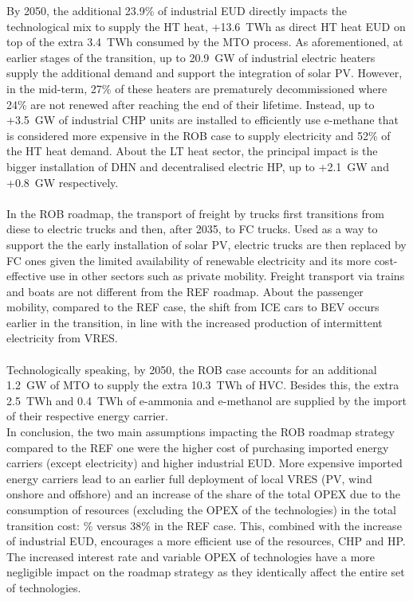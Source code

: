 By 2050, the additional 23.9\% of industrial \gls{EUD} directly impacts the technological mix to supply the \gls{HT} heat, \ie +13.6~TWh as direct \gls{HT} heat \gls{EUD} on top of the extra 3.4~TWh consumed by the \gls{MTO} process. As aforementioned, at earlier stages of the transition, up to 20.9~GW of industrial electric heaters supply the additional demand and support the integration of solar \gls{PV}.  However, in the mid-term, 27\% of these heaters are prematurely decommissioned where 24\% are not renewed after reaching the end of their lifetime. Instead, up to +3.5~GW of industrial \gls{CHP} units are installed to efficiently use e-methane that is considered more expensive in the ROB case to supply electricity and 52\% of the \gls{HT} heat demand. About the \gls{LT} heat sector, the principal impact is the bigger installation of \gls{DHN} and decentralised electric \gls{HP}, up to +2.1~GW and +0.8~GW respectively. \\

\\

In the ROB roadmap, the transport of freight by trucks first transitions from diese to electric trucks and then, after 2035, to \gls{FC} trucks. Used as a way to support the the early installation of solar \gls{PV}, electric trucks are then replaced by \gls{FC} ones given the limited availability of renewable electricity and its more cost-effective use in other sectors such as private mobility. Freight transport via trains and boats are not different from the REF roadmap. About the passenger mobility, compared to the REF case, the shift from \gls{ICE} cars to \gls{BEV} occurs earlier in the transition, in line with the increased production of intermittent electricity from \gls{VRES}. \\

\\

Technologically speaking, by 2050, the ROB case accounts for an additional 1.2~GW of \gls{MTO} to supply the extra 10.3~TWh of \gls{HVC}. Besides this, the extra 2.5~TWh and 0.4~TWh of e-ammonia and e-methanol are supplied by the import of their respective energy carrier.\\

In conclusion, the two main assumptions impacting the ROB roadmap strategy compared to the REF one were the higher cost of purchasing imported energy carriers (except electricity) and higher industrial \gls{EUD}. More expensive imported energy carriers lead to an earlier full deployment of local \gls{VRES} (\ie \gls{PV}, wind onshore and offshore) and an increase of the share of the total OPEX due to the consumption of resources (\ie excluding the OPEX of the technologies) in the total transition cost: \% versus 38\% in the REF case. This, combined with the increase of industrial \gls{EUD}, encourages a more efficient use of the resources, \ie \gls{CHP} and \gls{HP}. The increased interest rate and variable OPEX of technologies have a more negligible impact on the roadmap strategy as they identically affect the entire set of technologies.

